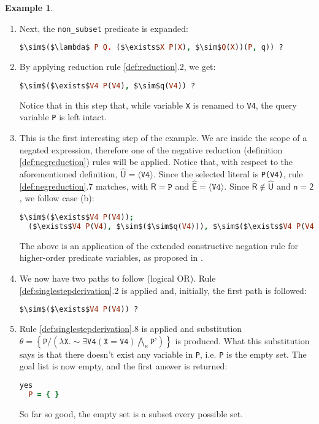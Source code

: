\documentclass[inscr,ack,preface]{dithesis}
\theoremstyle{definition}
\newtheorem{example}{Example}[chapter]
\newcommand{\msf}[1]{$\mathsf{#1}$}
\begin{document}
\begin{example}
\begin{enumerate}
\item Next, the \texttt{non\_subset} predicate is expanded:
\begin{lstlisting}[language=Prolog,%
  frame=single,breaklines=false,mathescape=true]
  $\sim$($\lambda$ P Q. ($\exists$X P(X), $\sim$Q(X))(P, q)) ?
\end{lstlisting}

\item By applying reduction rule \ref{def:reduction}.2, we get:
\begin{lstlisting}[language=Prolog,%
  frame=single,breaklines=false,mathescape=true]
  $\sim$($\exists$V4 P(V4), $\sim$q(V4)) ?
\end{lstlisting}
Notice that in this step that, while variable \texttt{X} is renamed to \texttt{V4}, the query variable \texttt{P} is left intact.

\item This is the first interesting step of the example. We are inside the scope of a negated expression, therefore one of the negative reduction (definition \ref{def:negreduction}) rules will be applied. Notice that, with respect to the aforementioned definition, \msf{\widehat{U} = \langle \texttt{V4} \rangle}. Since the selected literal is \texttt{P(V4)}, rule \ref{def:negreduction}.7 matches, with \msf{R = \texttt{P}} and \msf{\widehat{E} = \langle \texttt{V4} \rangle}. Since \msf{R \not\in \widehat{U}} and \msf{n=2}, we follow case (b):
\begin{lstlisting}[language=Prolog,%
  frame=single,breaklines=false,mathescape=true]
  $\sim$($\exists$V4 P(V4));
  ($\exists$V4 P(V4), $\sim$($\sim$q(V4))), $\sim$($\exists$V4 P(V4), $\sim$q(V4)) ?
\end{lstlisting}
The above is an application of the extended constructive negation rule for higher-order predicate variables, as proposed in \cite{DBLP:conf/kr/CharalambidisR14}.

\item We now have two paths to follow (logical OR). Rule \ref{def:singlestepderivation}.2 is applied and, initially, the first path is followed:
\begin{lstlisting}[language=Prolog,%
  frame=single,breaklines=false,mathescape=true]
  $\sim$($\exists$V4 P(V4)) ?
\end{lstlisting}

\item Rule \ref{def:singlestepderivation}.8 is applied and substitution \msf{\theta=\left\{ \texttt{P} / \left( \lambda \texttt{X}. \sim\exists \texttt{V4} ( \texttt{X} = \texttt{V4}) \bigwedge_{\kappa} \texttt{P'} \right) \right\}} is produced. What this substitution says is that there doesn't exist any variable in \texttt{P}, i.e. \texttt{P} is the empty set. The goal list is now empty, and the first answer is returned:
\begin{lstlisting}[language=Prolog,%
  frame=single,breaklines=false,mathescape=true]
  yes
  P = { }
\end{lstlisting}
So far so good, the empty set is a subset every possible set.


\end{enumerate}
\end{example}
\end{document}

